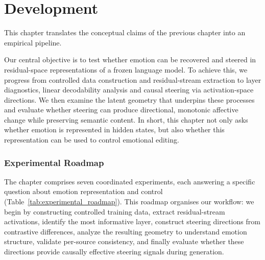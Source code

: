 \chapter{Development}


This chapter translates the conceptual claims of the previous chapter into an empirical pipeline.\par
Our central objective is to test whether emotion can be recovered and steered in residual-space representations of a frozen language model. To achieve this, we progress from controlled data construction and residual-stream extraction to layer diagnostics, linear decodability analysis and causal steering via activation-space directions. We then examine the latent geometry that underpins these processes and evaluate whether steering can produce directional, monotonic affective change while preserving semantic content. In short, this chapter not only asks whether emotion is represented in hidden states, but also whether this representation can be used to control emotional editing.\par

\subsection*{Experimental Roadmap}
The chapter comprises seven coordinated experiments, each answering a specific question about emotion representation and control (Table~\ref{tab:experimental_roadmap}). This roadmap organises our workflow: we begin by constructing controlled training data, extract residual-stream activations, identify the most informative layer, construct steering directions from contrastive differences, analyze the resulting geometry to understand emotion structure, validate per-source consistency, and finally evaluate whether these directions provide causally effective steering signals during generation.


